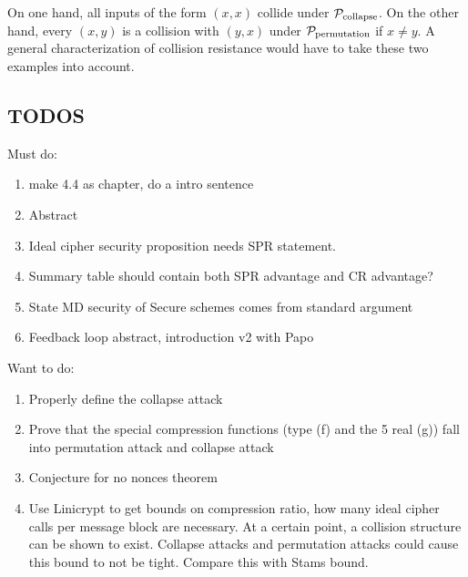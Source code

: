 On one hand, all inputs of the form $(x,x)$ collide under $\P_{\mathrm{collapse}}$.
On the other hand, every $(x,y)$ is a collision with $(y,x)$ under $\P_{\mathrm{permutation}}$ if $x \neq y$.
A general characterization of collision resistance would have to take these two examples into account.

\pagebreak

\subsection{TODOS}

Must do:
\begin{enumerate}
\item make 4.4 as chapter, do a intro sentence
\item Abstract
\item Ideal cipher security proposition needs SPR statement.
\item Summary table should contain both SPR advantage and CR advantage?
\item State MD security of Secure schemes comes from standard argument
\item Feedback loop abstract, introduction v2 with Papo
\end{enumerate}

Want to do:
\begin{enumerate}
\item Properly define the collapse attack
\item Prove that the special compression functions (type (f) and the 5 real (g)) fall into permutation attack and collapse attack
\item Conjecture for no nonces theorem
\item Use Linicrypt to get bounds on compression ratio, how many ideal cipher calls per message block are necessary.
At a certain point, a collision structure can be shown to exist.
Collapse attacks and permutation attacks could cause this bound to not be tight.
Compare this with Stams bound.
\end{enumerate}
